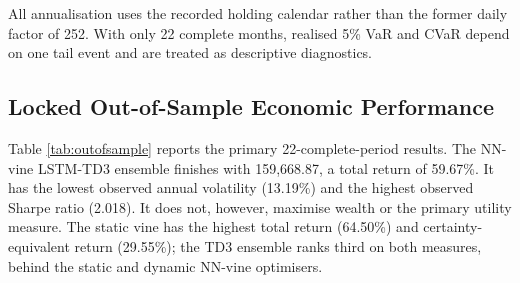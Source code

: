 All annualisation uses the recorded holding calendar rather than the former daily factor of 252. With only 22 complete months, realised 5\% VaR and CVaR depend on one tail event and are treated as descriptive diagnostics.

\subsection{Locked Out-of-Sample Economic Performance}
\label{subsec:4_outofsample}

Table \ref{tab:outofsample} reports the primary 22-complete-period results. The NN-vine LSTM-TD3 ensemble finishes with 159,668.87, a total return of 59.67\%. It has the lowest observed annual volatility (13.19\%) and the highest observed Sharpe ratio (2.018). It does not, however, maximise wealth or the primary utility measure. The static vine has the highest total return (64.50\%) and certainty-equivalent return (29.55\%); the TD3 ensemble ranks third on both measures, behind the static and dynamic NN-vine optimisers.

\begin{table}[H]
\centering
\caption{Frozen Out-of-Sample Performance: 22 Complete Holding Periods}
\label{tab:outofsample}
\caption*{\footnotesize Notes: Volatility, CAGR, and CRRA certainty-equivalent return are annualised. Bold denotes the best observed value, with lower values preferred for volatility and drawdown. These rankings are descriptive and do not imply statistical significance.}
\end{table}

